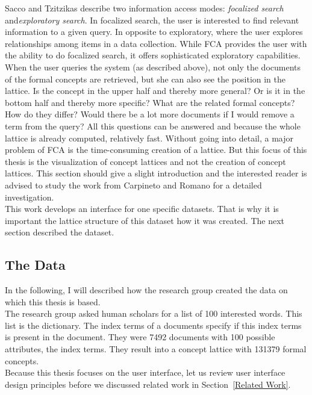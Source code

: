 \documentclass[11pt]{report}
\begin{document}
Sacco and Tzitzikas \cite{Sacco2009} describe two information access modes: \textit{focalized search} and\textit{exploratory search}. In focalized search, the user is interested to find relevant information to a given query. In opposite to exploratory, where the user explores relationships among items in a data collection. While FCA provides the user with the ability to do focalized search, it offers sophisticated exploratory capabilities. When the user queries the system (as described above), not only the documents of the formal concepts are retrieved, but she can also see the position in the lattice. Is the concept in the upper half and thereby more general? Or is it in the bottom half and thereby more specific? What are the related formal concepts? How do they differ? Would there be a lot more documents if I would remove a term from the query? All this questions can be answered and because the whole lattice is already computed, relatively fast. Without going into detail, a major problem of FCA is the time-consuming creation of a lattice. But this focus of this thesis is the visualization of concept lattices and not the creation of concept lattices. This section should give a slight introduction and the interested reader is advised to study the work from Carpineto and Romano \cite{carpineto2004concept} for a detailed investigation. \\

This work develops an interface for one specific datasets. That is why it is important the lattice structure of this dataset how it was created. The next section described the dataset.

\subsection{The Data}
In the following, I will described how the research group created the data on which this thesis is based. \\

The research group asked human scholars for a list of 100 interested words. This list is the dictionary. The index terms of a documents specify if this index terms is present in the document. They were 7492 documents with 100 possible attributes, the index terms. They result into a concept lattice with 131379 formal concepts.\\

Because this thesis focuses on the user interface, let us review user interface design principles before we discussed related work in Section~\ref{Related Work}. \\
\end{document}
